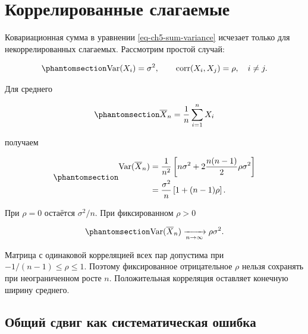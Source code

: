 \documentclass[
  russian,
  11pt,
  a4paper,
  open=any]{scrbook}
\begin{document}
\section{Коррелированные
слагаемые}\label{ux43aux43eux440ux440ux435ux43bux438ux440ux43eux432ux430ux43dux43dux44bux435-ux441ux43bux430ux433ux430ux435ux43cux44bux435}

Ковариационная сумма в уравнении \ref{eq-ch5-sum-variance} исчезает
только для некоррелированных слагаемых. Рассмотрим простой случай:

\begin{equation}\protect\phantomsection\label{eq-ch5-equicorrelated-variables}{
\operatorname{Var}(X_i)=\sigma^2,
\qquad
\operatorname{corr}(X_i,X_j)=\rho,
\quad i\ne j.
}\end{equation}

Для среднего

\begin{equation}\protect\phantomsection\label{eq-ch5-equicorrelated-mean}{
\overline X_n=\frac1n\sum_{i=1}^{n}X_i
}\end{equation}

получаем

\begin{equation}\protect\phantomsection\label{eq-ch5-equicorrelated-mean-variance}{
\begin{aligned}
\operatorname{Var}(\overline X_n)
&=\frac1{n^2}\left[
n\sigma^2+2\frac{n(n-1)}2\rho\sigma^2
\right]\\
&=\frac{\sigma^2}{n}\left[1+(n-1)\rho\right].
\end{aligned}
}\end{equation}

При \(\rho=0\) остаётся \(\sigma^2/n\). При фиксированном \(\rho>0\)

\begin{equation}\protect\phantomsection\label{eq-ch5-equicorrelated-variance-limit}{
\operatorname{Var}(\overline X_n)
\xrightarrow[n\to\infty]{}\rho\sigma^2.
}\end{equation}

Матрица с одинаковой корреляцией всех пар допустима при
\(-1/(n-1)\le\rho\le1\). Поэтому фиксированное отрицательное \(\rho\)
нельзя сохранять при неограниченном росте \(n\). Положительная
корреляция оставляет конечную ширину среднего.

\subsection{Общий сдвиг как систематическая
ошибка}\label{interactive-correlated-errors}
\end{document}
